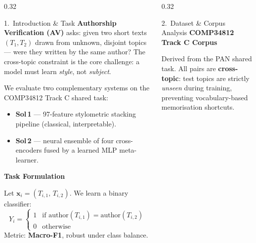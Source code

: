 \documentclass[final,t]{beamer}
\institute{Department of Computer Science, University of Manchester}
\newcommand{\vx}{\mathbf{x}}
\begin{document}
\begin{frame}[t]

\begin{columns}[T,totalwidth=\linewidth]
  \begin{column}{0.32\linewidth}
    \begin{exampleblock}{1.\ Introduction \& Task}
      \textbf{Authorship Verification (AV)} asks: given two short texts
      $(T_1, T_2)$ drawn from unknown, disjoint topics — were they
      written by the same author?  The cross-topic constraint is the
      core challenge: a model must learn \emph{style}, not \emph{subject}.

      \vspace{0.4ex}
      We evaluate two complementary systems on the COMP34812 Track C shared task:
      \begin{itemize}\itemsep1pt
        \item \textbf{Sol\,1} — 97-feature stylometric stacking pipeline
              (classical, interpretable).
        \item \textbf{Sol\,2} — neural ensemble of four cross-encoders
              fused by a learned MLP meta-learner.
      \end{itemize}

      \vspace{0.8ex}
      \textbf{Task Formulation}\par
      \vspace*{0.2ex}
      Let $\vx_i = (T_{i,1},\,T_{i,2})$.  We learn a binary classifier:
      \[
        Y_i = \begin{cases}
          1 & \text{if } \mathrm{author}(T_{i,1}) = \mathrm{author}(T_{i,2}) \\[2pt]
          0 & \text{otherwise}
        \end{cases}
      \]
      Metric: \textbf{Macro-F1}, robust under class balance.
    \end{exampleblock}
  \end{column}

  \begin{column}{0.32\linewidth}
    \begin{exampleblock}{2.\ Dataset \& Corpus Analysis}
      \textbf{COMP34812 Track C Corpus}\par
      \vspace*{0.2ex}
      Derived from the PAN shared task. All pairs are \textbf{cross-topic}:
      test topics are strictly \emph{unseen} during training, preventing
      vocabulary-based memorisation shortcuts.


\end{exampleblock}
\end{column}
\end{columns}
\end{frame}
\end{document}
